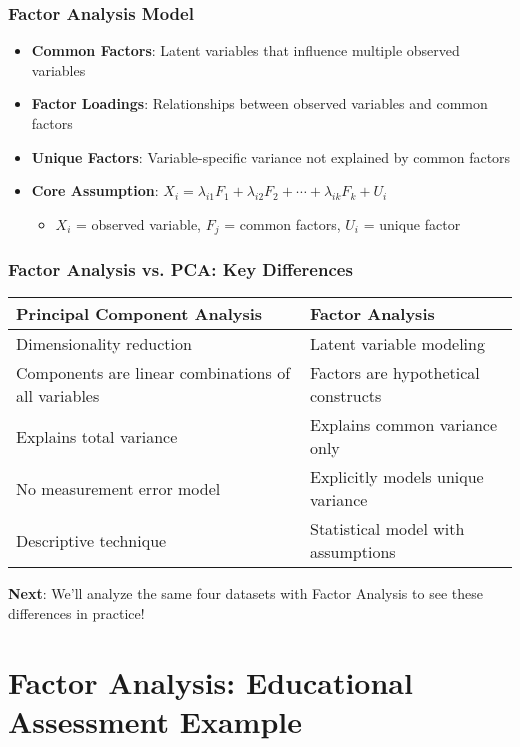\documentclass[aspectratio=169]{beamer}
\begin{document}
\begin{frame}[fragile]
    \frametitle{Factor Analysis Model}
    \begin{itemize}
        \item \textbf{Common Factors}: Latent variables that influence multiple observed variables \pause
        \item \textbf{Factor Loadings}: Relationships between observed variables and common factors \pause
        \item \textbf{Unique Factors}: Variable-specific variance not explained by common factors \pause
        \item \textbf{Core Assumption}: $X_i = \lambda_{i1}F_1 + \lambda_{i2}F_2 + \cdots + \lambda_{ik}F_k + U_i$
              \begin{itemize}
                  \item $X_i$ = observed variable, $F_j$ = common factors, $U_i$ = unique factor
              \end{itemize}
    \end{itemize}
\end{frame}

\begin{frame}[fragile]
    \frametitle{Factor Analysis vs. PCA: Key Differences}
    \begin{center}
    \begin{tabular}{|p{5cm}|p{5cm}|}
    \hline
    \textbf{Principal Component Analysis} & \textbf{Factor Analysis} \\
    \hline
    Dimensionality reduction & Latent variable modeling \\
    \hline
    Components are linear combinations of all variables & Factors are hypothetical constructs \\
    \hline
    Explains total variance & Explains common variance only \\
    \hline
    No measurement error model & Explicitly models unique variance \\
    \hline
    Descriptive technique & Statistical model with assumptions \\
    \hline
    \end{tabular}
    \end{center}
    \vspace{12pt}
    \textbf{Next}: We'll analyze the same four datasets with Factor Analysis to see these differences in practice!
\end{frame}

\section{Factor Analysis: Educational Assessment Example}
\end{document}
